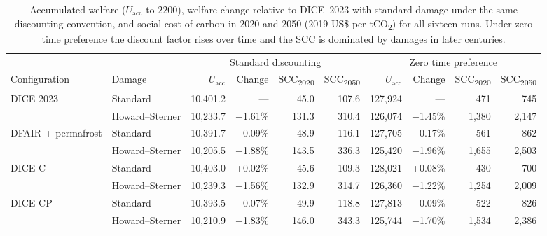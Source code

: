 \begin{table}[H]
\centering
\caption{Accumulated welfare ($U_\text{acc}$ to 2200), welfare change relative to DICE~2023 with standard damage under the same discounting convention, and social cost of carbon in 2020 and 2050 (2019 US\$ per tCO\textsubscript{2}) for all sixteen runs. Under zero time preference the discount factor rises over time and the SCC is dominated by damages in later centuries.}
\label{tab:scc_full}
\footnotesize
\setlength{\tabcolsep}{3pt}
\begin{tabular}{llrrrrrrrr}
\toprule
 & & \multicolumn{4}{c}{Standard discounting} & \multicolumn{4}{c}{Zero time preference} \\
\cmidrule(lr){3-6}\cmidrule(lr){7-10}
Configuration & Damage & $U_\text{acc}$ & Change & SCC\textsubscript{2020} & SCC\textsubscript{2050} & $U_\text{acc}$ & Change & SCC\textsubscript{2020} & SCC\textsubscript{2050} \\
\midrule
DICE 2023 & Standard & 10{,}401.2 & --- & 45.0 & 107.6 & 127{,}924 & --- & 471 & 745 \\
 & Howard--Sterner & 10{,}233.7 & $-$1.61\% & 131.3 & 310.4 & 126{,}074 & $-$1.45\% & 1{,}380 & 2{,}147 \\
\addlinespace
DFAIR + permafrost & Standard & 10{,}391.7 & $-$0.09\% & 48.9 & 116.1 & 127{,}705 & $-$0.17\% & 561 & 862 \\
 & Howard--Sterner & 10{,}205.5 & $-$1.88\% & 143.5 & 336.3 & 125{,}420 & $-$1.96\% & 1{,}655 & 2{,}503 \\
\addlinespace
DICE-C & Standard & 10{,}403.0 & +0.02\% & 45.6 & 109.3 & 128{,}021 & +0.08\% & 430 & 700 \\
 & Howard--Sterner & 10{,}239.3 & $-$1.56\% & 132.9 & 314.7 & 126{,}360 & $-$1.22\% & 1{,}254 & 2{,}009 \\
\addlinespace
DICE-CP & Standard & 10{,}393.5 & $-$0.07\% & 49.9 & 118.8 & 127{,}813 & $-$0.09\% & 522 & 826 \\
 & Howard--Sterner & 10{,}210.9 & $-$1.83\% & 146.0 & 343.3 & 125{,}744 & $-$1.70\% & 1{,}534 & 2{,}386 \\
\bottomrule
\end{tabular}
\end{table}
